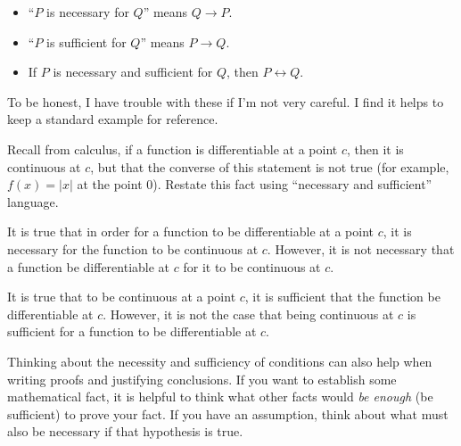 \documentclass[11pt,]{book}
\theoremstyle{ptxplainnotitle}
\theoremstyle{ptxplaintitle}
\theoremstyle{ptxdefinitionnotitle}
\theoremstyle{ptxdefinitiontitle}
\theoremstyle{ptxdefinitionnotitle}
\theoremstyle{ptxdefinitiontitle}
\theoremstyle{ptxdefinitionnotitle}
\theoremstyle{ptxdefinitiontitle}
\theoremstyle{ptxdefinitiontitlenonumber}
\theoremstyle{ptxdefinitiontitlenonumber}
\numberwithin{equation}{chapter}
\renewcommand{\iff}{\leftrightarrow}
\newcommand{\imp}{\rightarrow}
\begin{document}
\begin{assemblage}\label{assemblage-31}
\hypertarget{p-1813}{}%
\par
\hypertarget{p-1814}{}%
%
\begin{itemize}[label=\textbullet]
\item{}``\(P\) is necessary for \(Q\)'' means \(Q \imp P\).%
\item{}``\(P\) is sufficient for \(Q\)'' means \(P \imp Q\).%
\item{}\hypertarget{p-1815}{}%
If \(P\) is necessary and sufficient for \(Q\), then \(P \iff Q\).%
\end{itemize}
%
\end{assemblage}
\hypertarget{p-1816}{}%
To be honest, I have trouble with these if I'm not very careful. I find it helps to keep a standard example for reference.%
\begin{example}\label{example-55}
\hypertarget{p-1817}{}%
Recall from calculus, if a function is differentiable at a point \(c\), then it is continuous at \(c\), but that the converse of this statement is not true (for example, \(f(x) = |x|\) at the point 0). Restate this fact using ``necessary and sufficient'' language.%
\par\smallskip%
\noindent\textbf{}\hypertarget{solution-221}{}\hypertarget{p-1818}{}%
It is true that in order for a function to be differentiable at a point \(c\), it is necessary for the function to be continuous at \(c\). However, it is not necessary that a function be differentiable at \(c\) for it to be continuous at \(c\).%
\par
\hypertarget{p-1819}{}%
It is true that to be continuous at a point \(c\), it is sufficient that the function be differentiable at \(c\). However, it is not the case that being continuous at \(c\) is sufficient for a function to be differentiable at \(c\).%
\end{example}
\hypertarget{p-1820}{}%
Thinking about the necessity and sufficiency of conditions can also help when writing proofs and justifying conclusions. If you want to establish some mathematical fact, it is helpful to think what other facts would \emph{be enough} (be sufficient) to prove your fact. If you have an assumption, think about what must also be necessary if that hypothesis is true.%
\typeout{************************************************}
\typeout{************************************************}
\end{document}
